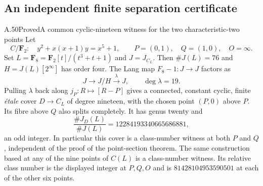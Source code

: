 \subsection{An independent finite separation certificate}

\begin{claim}{A.50}{Proved}{A common cyclic-nineteen witness for the two characteristic-two points}
Let
\[
 C/\mathbf F _2:\quad y^2+x(x+1)y=x^5+1,
 \qquad P=(0,1),\quad Q=(1,0),\quad O=\infty.
\]
Set $L=\mathbf F _8=\mathbf F _2[t]/(t^3+t+1)$ and $J=J_{C_L}$.
Then $\#J(L)=76$ and $H=J(L)[2^\infty]$ has order four.
The Lang map $F_8-1:J\longrightarrow J$ factors as
\[
 J\longrightarrow J/H\xrightarrow{\lambda}J,
 \qquad \deg\lambda=19.
\]
Pulling $\lambda$ back along $j_P:R\mapsto[R-P]$ gives a connected,
constant cyclic, finite \emph{\'etale} cover $D\to C_L$ of degree
nineteen, with the chosen point $(P,0)$ above $P$. Its fibre above $Q$
also splits completely. It has genus twenty and
\[
 \frac{\#J_D(L)}{\#J(L)}=12284193340665686881,
\]
an odd integer. In particular this cover is a class-number witness at
both $P$ and $Q$, independent of the proof of the point-section theorem.
The same construction based at any of the nine points of $C(L)$ is a
class-number witness. Its relative class number is the displayed integer
at $P,Q,O$ and is $81428104953590501$ at each of the other six points.
\end{claim}

